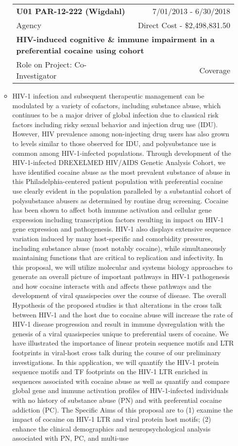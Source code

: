 \documentclass[a4paper,11pt]{article}
\makeatletter
\newenvironment{fullwidth}
    {\par
     \setlength{\@totalleftmargin}{0pt}%
     \setlength{\linewidth}{\hsize}%
     \list{}{\setlength{\leftmargin}{0pt}}
     \item\relax}
    {\endlist}
\makeatother
\begin{document}
\begin{enumerate}
\begin{itemize}
  \begin{longtable}{lr}
    \textbf{U01 PAR-12-222 (Wigdahl)} & 7/01/2013 - 6/30/2018 \\
    Agency & Direct Cost - \$2,498,831.50 \\
    \multicolumn{2}{p{0.973\textwidth}}{\bfseries HIV-induced cognitive \& immune impairment in a preferential cocaine using cohort } \\
    Role on Project:  Co-Investigator & Coverage \\
    \end{longtable}
   \begin{fullwidth}
   HIV-1 infection and subsequent therapeutic management can be modulated by a variety of cofactors, including substance abuse, which continues to be a major driver of global infection due to classical risk factors including risky sexual behavior and injection drug use (IDU).  However, HIV prevalence among non-injecting drug users has also grown to levels similar to those observed for IDU, and polysubstance use is common among HIV-1-infected populations.  Through development of the HIV-1-infected DREXELMED HIV/AIDS Genetic Analysis Cohort, we have identified cocaine abuse as the most prevalent substance of abuse in this Philadelphia-centered patient population with preferential cocaine use clearly evident in the population paralleled by a substantial cohort of polysubstance abusers as determined by routine drug screening.  Cocaine has been shown to affect both immune activation and cellular gene expression including transcription factors resulting in impact on HIV-1 gene expression and pathogenesis.  HIV-1 also displays extensive sequence variation induced by many host-specific and comorbidity pressures, including substance abuse (most notably cocaine), while simultaneously maintaining functions that are critical to replication and infectivity. In this proposal, we will utilize molecular and systems biology approaches to generate an overall picture of important pathways in HIV-1 pathogenesis and how cocaine interacts with and affects these pathways and the development of viral quasispecies over the course of disease.  The overall Hypothesis of the proposed studies is that alterations in the cross talk between HIV-1 and the host due to cocaine abuse will increase the rate of HIV-1 disease progression and result in immune dysregulation with the genesis of a viral quasispecies unique to preferential users of cocaine.  We have illustrated the importance of linear protein sequence motifs and LTR footprints in viral-host cross talk during the course of our preliminary investigations.  In this application, we will quantify the HIV-1 protein sequence motifs and TF footprints on the HIV-1 LTR enriched in sequences associated with cocaine abuse as well as quantify and compare global gene and immune activation profiles of HIV-1-infected individuals with no history of substance abuse (PN) and with preferential cocaine addiction (PC). The Specific Aims of this proposal are to (1) examine the impact of cocaine on HIV-1 LTR and viral protein host motifs; (2) enhance the clinical demographics and neuropsychological analysis associated with PN, PC, and multi-use 
\end{fullwidth}
\end{itemize}
\end{enumerate}
\end{document}
